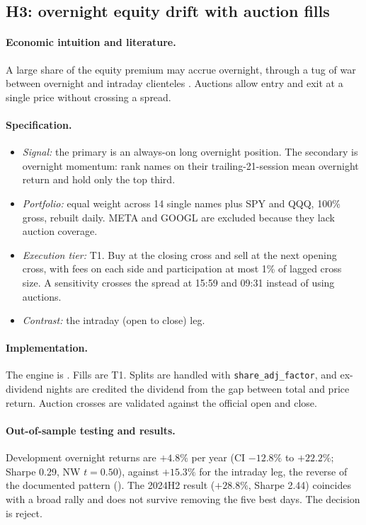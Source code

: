 \documentclass[../main.tex]{subfiles}
\begin{document}
\subsection{H3: overnight equity drift with auction fills}\label{sec:h3}

\paragraph{Economic intuition and literature.}
A large share of the equity premium may accrue overnight, through a tug of war between overnight and intraday clienteles \citep{lou2019,cliff2008}. Auctions allow entry and exit at a single price without crossing a spread.

\paragraph{Specification.}
\begin{itemize}
\item \emph{Signal:} the primary is an always-on long overnight position. The secondary is overnight momentum: rank names on their trailing-21-session mean overnight return and hold only the top third.
\item \emph{Portfolio:} equal weight across 14 single names plus SPY and QQQ, 100\% gross, rebuilt daily. META and GOOGL are excluded because they lack auction coverage.
\item \emph{Execution tier:} T1. Buy at the closing cross and sell at the next opening cross, with fees on each side and participation at most 1\% of lagged cross size. A sensitivity crosses the spread at 15:59 and 09:31 instead of using auctions.
\item \emph{Contrast:} the intraday (open to close) leg.
\end{itemize}

\paragraph{Implementation.}
The engine is . Fills are T1. Splits are handled with \texttt{share\_adj\_factor}, and ex-dividend nights are credited the dividend from the gap between total and price return. Auction crosses are validated against the official open and close.

\paragraph{Out-of-sample testing and results.}
Development overnight returns are $+4.8\%$ per year (CI $-12.8\%$ to $+22.2\%$; Sharpe 0.29, NW $t=0.50$), against $+15.3\%$ for the intraday leg, the reverse of the documented pattern (). The 2024H2 result ($+28.8\%$, Sharpe 2.44) coincides with a broad rally and does not survive removing the five best days. The decision is reject.
\end{document}
